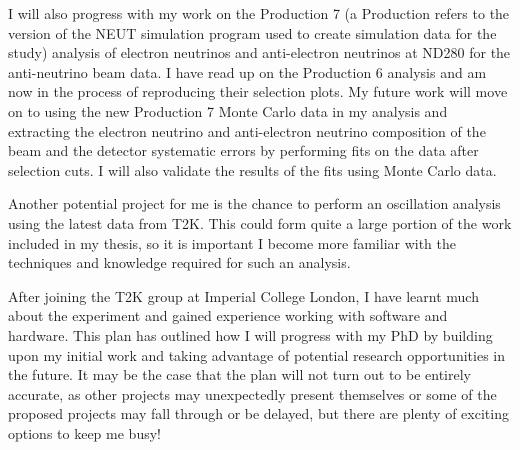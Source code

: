 \documentclass[aps,pra,12pt,notitlepage,tightenlines]{revtex4-1}
\begin{document}
I will also progress with my work on the Production 7 (a Production refers to the version of the NEUT simulation program used to create simulation data for the study) analysis of electron neutrinos and anti-electron neutrinos at ND280 for the anti-neutrino beam data. I have read up on the Production 6 analysis and am now in the process of reproducing their selection plots. My future work will move on to using the new Production 7 Monte Carlo data in my analysis and extracting the electron neutrino and anti-electron neutrino composition of the beam and the detector systematic errors by performing fits on the data after selection cuts. I will also validate the results of the fits using Monte Carlo data.

Another potential project for me is the chance to perform an oscillation analysis using the latest data from T2K. This could form quite a large portion of the work included in my thesis, so it is important I become more familiar with the techniques and knowledge required for such an analysis.

After joining the T2K group at Imperial College London, I have learnt much about the experiment and gained experience working with software and hardware. This plan has outlined how I will progress with my PhD by building upon my initial work and taking advantage of potential research opportunities in the future. It may be the case that the plan will not turn out to be entirely accurate, as other projects may unexpectedly present themselves or some of the proposed projects may fall through or be delayed, but there are plenty of exciting options to keep me busy!
\end{document}
